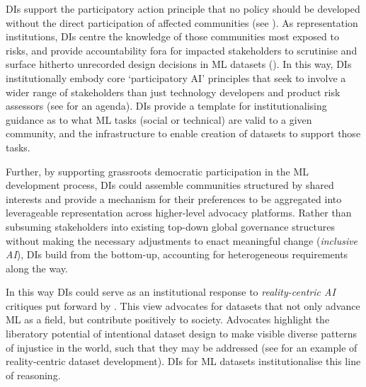 DIs support the participatory action principle that no policy should be developed without the direct participation of affected communities (see \textcite{mcdowell2023RethinkingArtificialIntelligence}). As representation institutions, DIs centre the knowledge of those communities most exposed to risks, and provide accountability fora for impacted stakeholders to scrutinise and surface hitherto unrecorded design decisions in ML datasets (\cite{frey2020ArtificialIntelligenceInclusion}). In this way, DIs institutionally embody core `participatory AI' principles that seek to involve a wider range of stakeholders than just technology developers and product risk assessors (see \textcite{ortega2020ManagingTransitionMultistakeholder} for an agenda). DIs provide a template for institutionalising guidance as to what ML tasks (social or technical) are valid to a given community, and the infrastructure to enable creation of datasets to support those tasks. 

Further, by supporting grassroots democratic participation in the ML development process, DIs could assemble communities structured by shared interests and provide a mechanism for their preferences to be aggregated into leverageable representation across higher-level advocacy platforms. Rather than subsuming stakeholders into existing top-down global governance structures without making the necessary adjustments to enact meaningful change (\textit{inclusive AI}), DIs build from the bottom-up, accounting for heterogeneous requirements along the way. 

In this way DIs could serve as an institutional response to \textit{reality-centric AI} critiques put forward by \textcite{RealityCentricAI}. This view advocates for datasets that not only advance ML as a field, but contribute positively to society. Advocates highlight the liberatory potential of intentional dataset design to make visible diverse patterns of injustice in the world, such that they may be addressed (see \textcite{DB4L} for an example of reality-centric dataset development). DIs for ML datasets institutionalise this line of reasoning. 


